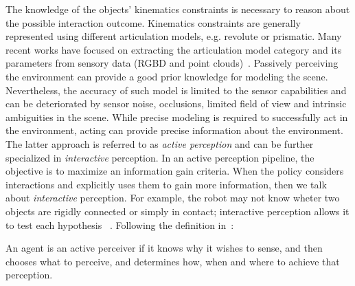The knowledge of the objects' kinematics constraints is necessary to reason about the possible interaction outcome. Kinematics constraints are generally represented using different articulation models, e.g. revolute or prismatic. Many recent works have focused on extracting the articulation model category and its parameters from sensory data (RGBD and point clouds)~\cite{abbatematteo2019learning, li2020category}. 
Passively perceiving the environment can provide a good prior knowledge for modeling the scene. Nevertheless, the accuracy of such model is limited to the sensor capabilities and can be deteriorated by sensor noise, occlusions, limited field of view and intrinsic ambiguities in the scene. While precise modeling is required to successfully act in the environment, acting can provide precise information about the environment. The latter approach is referred to as \emph{active perception} and can be further specialized in \emph{interactive} perception. In an active perception pipeline, the objective is to maximize an information gain criteria. When the policy considers interactions and explicitly uses  them to gain more information, then we talk about \emph{interactive} perception. For example, the robot may not know wheter two objects are rigidly connected or simply in contact; interactive perception allows it to test each hypothesis ~\citep{kroemer2019review}. Following the definition in~\cite{bajcsy2018revisiting}:
\begin{displayquote}
An agent is an active perceiver if it knows why it wishes to sense, and then chooses what to perceive, and determines how, when and where to achieve that perception.
\end{displayquote}  

